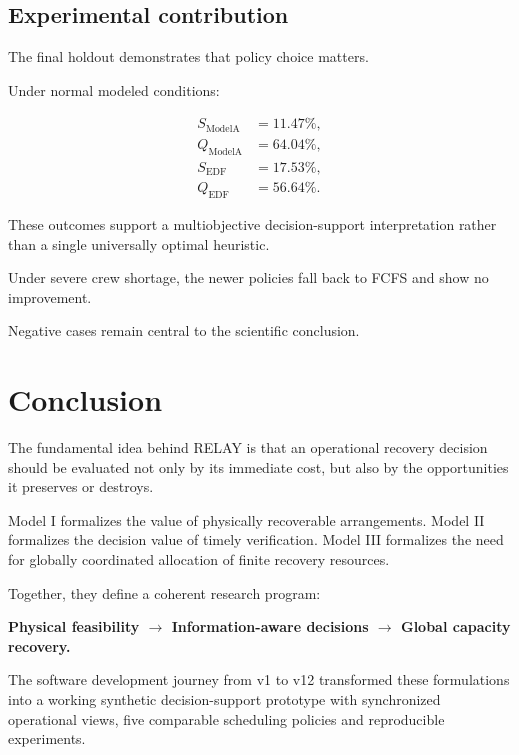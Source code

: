 \documentclass[10pt,a4paper]{article}
\theoremstyle{plain}
\theoremstyle{definition}
\theoremstyle{remark}
\begin{document}
\subsection{Experimental contribution}

The final holdout demonstrates
that policy choice matters.

Under normal modeled conditions:

\[
\begin{aligned}
S_{\mathrm{ModelA}}&=11.47\%,\\
Q_{\mathrm{ModelA}}&=64.04\%,\\
S_{\mathrm{EDF}}&=17.53\%,\\
Q_{\mathrm{EDF}}&=56.64\%.
\end{aligned}
\]

These outcomes support
a multiobjective decision-support
interpretation rather than a
single universally optimal heuristic.

Under severe crew shortage,
the newer policies fall back to
FCFS and show no improvement.

Negative cases remain central
to the scientific conclusion.

\section{Conclusion}

The fundamental idea behind RELAY
is that an operational recovery decision
should be evaluated not only by its
immediate cost,
but also by the opportunities
it preserves or destroys.

Model I formalizes the value of
physically recoverable arrangements.
Model II formalizes the decision value
of timely verification.
Model III formalizes the need for
globally coordinated allocation
of finite recovery resources.

Together, they define a coherent
research program:

\begin{center}
\textbf{\color{Navy}
Physical feasibility
\(\longrightarrow\)
Information-aware decisions
\(\longrightarrow\)
Global capacity recovery.
}
\end{center}

The software development journey
from v1 to v12 transformed these
formulations into a working
synthetic decision-support prototype
with synchronized operational views,
five comparable scheduling policies
and reproducible experiments.
\end{document}
